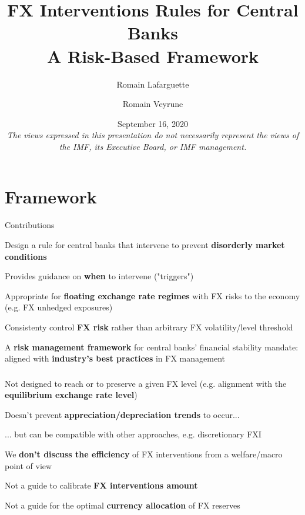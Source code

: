 \documentclass{beamer}
\title[]{FX Interventions Rules for Central Banks\\
A Risk-Based Framework}
\author[]{Romain Lafarguette \and Romain Veyrune}
\institute[]{IMF Monetary and Capital Markets Department \\ Central Bank Operations Division}
\date[]{\scriptsize September 16, 2020 \\ \vspace{0.5cm} \scriptsize{\textit{The views
      expressed in this presentation do not necessarily represent the views of
      the IMF, its Executive Board, or IMF management.}} \vspace{-0.3cm}}
\newenvironment{largeitemize}{\itemize\addtolength{\itemsep}{10pt}}{\enditemize}
\begin{document}
\begingroup
\renewcommand{\insertframenumber}{}
\begin{frame}
\maketitle
\end{frame}
\endgroup


\section{Framework}

\begin{frame}{Contributions}

  \begin{largeitemize}
    \item Design a rule for central banks that intervene to prevent \textbf{disorderly
        market conditions}
    \item Provides guidance on \textbf{when} to intervene ("triggers")
    \item Appropriate for \textbf{floating exchange rate regimes} with FX
      risks to the economy (e.g. FX unhedged exposures)
    \item Consistenty control \textbf{FX risk} rather than arbitrary FX volatility/level threshold
    \item A \textbf{risk management framework} for central banks' financial
      stability mandate: aligned with \textbf{industry's best practices} in FX management
  \end{largeitemize}
  
\end{frame}


\begin{frame}
  \frametitle{\color{red}{What the rule is NOT about}}
  \begin{alertblock}{}
    \begin{largeitemize}
    \item Not designed to reach or to preserve a given FX level
      (e.g. alignment with the \textbf{equilibrium exchange rate level})
    \item Doesn't prevent \textbf{appreciation/depreciation trends} to occur...
    \item ... but can be compatible with other approaches, e.g. discretionary FXI
    \item We \textbf{don't discuss the efficiency} of FX interventions from a
      welfare/macro point of view
    \item Not a guide to calibrate \textbf{FX interventions amount}
    \item Not a guide for the optimal \textbf{currency allocation} of FX reserves
    \end{largeitemize}    
  \end{alertblock}
  
\end{frame}
\end{document}
